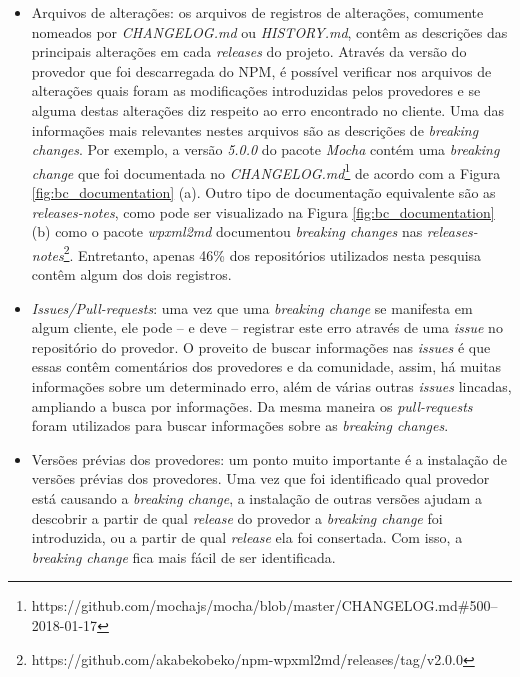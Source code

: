 \begin{itemize}
    \item Arquivos de alterações: os arquivos de registros de alterações, comumente nomeados por \textit{CHANGELOG.md} ou \textit{HISTORY.md}, contêm as descrições das principais alterações em cada \textit{releases} do projeto. Através da versão do provedor que foi descarregada do \gls{NPM}, é possível verificar nos arquivos de alterações quais foram as modificações introduzidas pelos provedores e se alguma destas alterações diz respeito ao erro encontrado no cliente. Uma das informações mais relevantes nestes arquivos são as descrições de \textit{breaking changes}. Por exemplo, a versão \textit{5.0.0} do pacote \textit{Mocha} contém uma \textit{breaking change} que foi documentada no \textit{CHANGELOG.md}\footnote{https://github.com/mochajs/mocha/blob/master/CHANGELOG.md\#500--2018-01-17} de acordo com a Figura \ref{fig:bc_documentation} (a). Outro tipo de documentação equivalente são as \textit{releases-notes}, como pode ser visualizado na Figura \ref{fig:bc_documentation} (b) como o pacote \textit{wpxml2md} documentou \textit{breaking changes} nas \textit{releases-notes}\footnote{https://github.com/akabekobeko/npm-wpxml2md/releases/tag/v2.0.0}. Entretanto, apenas 46\% dos repositórios utilizados nesta pesquisa contêm algum dos dois registros.

    \item \textit{Issues/Pull-requests}: uma vez que uma \textit{breaking change} se manifesta em algum cliente, ele pode -- e deve -- registrar este erro através de uma \textit{issue} no repositório do provedor. O proveito de buscar informações nas \textit{issues} é que essas contêm comentários dos provedores e da comunidade, assim, há muitas informações sobre um determinado erro, além de várias outras \textit{issues} lincadas, ampliando a busca por informações. Da mesma maneira os \textit{pull-requests} foram utilizados para buscar informações sobre as \textit{breaking changes}.

    \item Versões prévias dos provedores: um ponto muito importante é a instalação de versões prévias dos provedores. Uma vez que foi identificado qual provedor está causando a \textit{breaking change}, a instalação de outras versões ajudam a descobrir a partir de qual \textit{release} do provedor a \textit{breaking change} foi introduzida, ou a partir de qual \textit{release} ela foi consertada. Com isso, a \textit{breaking change} fica mais fácil de ser identificada.


\end{itemize}
